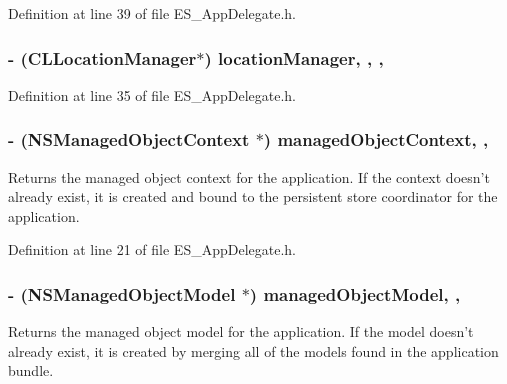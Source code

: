 Definition at line 39 of file E\+S\+\_\+\+App\+Delegate.\+h.

\hypertarget{interface_e_s___app_delegate_a99c4576cb9f0549816c81adb7cc21e48}{
\subsubsection[{location\+Manager}]{\setlength{\rightskip}{0pt plus 5cm}-\/ (C\+L\+Location\+Manager$\ast$) location\+Manager\hspace{0.3cm}{\ttfamily [read]}, {\ttfamily [write]}, {\ttfamily [nonatomic]}, {\ttfamily [strong]}}}\label{interface_e_s___app_delegate_a99c4576cb9f0549816c81adb7cc21e48}


Definition at line 35 of file E\+S\+\_\+\+App\+Delegate.\+h.

\hypertarget{interface_e_s___app_delegate_a5b1e1e8b44eecce334f3460e71eddb2b}{
\subsubsection[{managed\+Object\+Context}]{\setlength{\rightskip}{0pt plus 5cm}-\/ (N\+S\+Managed\+Object\+Context $\ast$) managed\+Object\+Context\hspace{0.3cm}{\ttfamily [read]}, {\ttfamily [nonatomic]}, {\ttfamily [retain]}}}\label{interface_e_s___app_delegate_a5b1e1e8b44eecce334f3460e71eddb2b}
Returns the managed object context for the application. If the context doesn't already exist, it is created and bound to the persistent store coordinator for the application. 

Definition at line 21 of file E\+S\+\_\+\+App\+Delegate.\+h.

\hypertarget{interface_e_s___app_delegate_abbb6de4a794de1f75bda5c2e0bccd328}{
\subsubsection[{managed\+Object\+Model}]{\setlength{\rightskip}{0pt plus 5cm}-\/ (N\+S\+Managed\+Object\+Model $\ast$) managed\+Object\+Model\hspace{0.3cm}{\ttfamily [read]}, {\ttfamily [nonatomic]}, {\ttfamily [retain]}}}\label{interface_e_s___app_delegate_abbb6de4a794de1f75bda5c2e0bccd328}
Returns the managed object model for the application. If the model doesn't already exist, it is created by merging all of the models found in the application bundle. 

